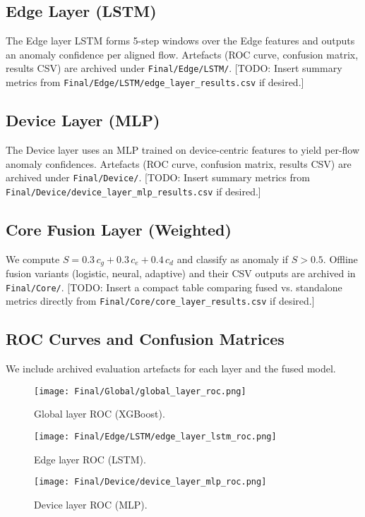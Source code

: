 \documentclass[conference]{IEEEtran}
\begin{document}
\subsection{Edge Layer (LSTM)}
The Edge layer LSTM forms 5-step windows over the Edge features and outputs an anomaly confidence per aligned flow. Artefacts (ROC curve, confusion matrix, results CSV) are archived under \texttt{Final/Edge/LSTM/}. [TODO: Insert summary metrics from \texttt{Final/Edge/LSTM/edge\_layer\_results.csv} if desired.]

\subsection{Device Layer (MLP)}
The Device layer uses an MLP trained on device-centric features to yield per-flow anomaly confidences. Artefacts (ROC curve, confusion matrix, results CSV) are archived under \texttt{Final/Device/}. [TODO: Insert summary metrics from \texttt{Final/Device/device\_layer\_mlp\_results.csv} if desired.]

\subsection{Core Fusion Layer (Weighted)}
We compute $S = 0.3\,c_g + 0.3\,c_e + 0.4\,c_d$ and classify as anomaly if $S>0.5$. Offline fusion variants (logistic, neural, adaptive) and their CSV outputs are archived in \texttt{Final/Core/}. [TODO: Insert a compact table comparing fused vs. standalone metrics directly from \texttt{Final/Core/core\_layer\_results.csv} if desired.]

\subsection{ROC Curves and Confusion Matrices}
We include archived evaluation artefacts for each layer and the fused model.

\begin{figure}[htbp]
\centering
\texttt{[image: Final/Global/global\_layer\_roc.png]}
\caption{Global layer ROC (XGBoost).}
\label{fig:roc_global}
\end{figure}

\begin{figure}[htbp]
\centering
\texttt{[image: Final/Edge/LSTM/edge\_layer\_lstm\_roc.png]}
\caption{Edge layer ROC (LSTM).}
\label{fig:roc_edge}
\end{figure}

\begin{figure}[htbp]
\centering
\texttt{[image: Final/Device/device\_layer\_mlp\_roc.png]}
\caption{Device layer ROC (MLP).}
\label{fig:roc_device}
\end{figure}
\end{document}

